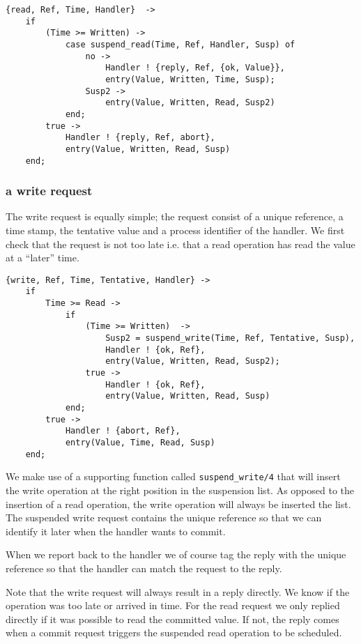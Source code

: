 \documentclass[a4paper, 11pt]{article}
\begin{document}
\begin{verbatim}
{read, Ref, Time, Handler}  ->
    if
        (Time >= Written) ->
            case suspend_read(Time, Ref, Handler, Susp) of
                no ->
                    Handler ! {reply, Ref, {ok, Value}},
                    entry(Value, Written, Time, Susp);
                Susp2 ->
                    entry(Value, Written, Read, Susp2)
            end;
        true ->
            Handler ! {reply, Ref, abort},
            entry(Value, Written, Read, Susp)
    end;
\end{verbatim}

\subsubsection{a write request}

The write request is equally simple; the request consist of a unique
reference, a time stamp, the tentative value and a process identifier
of the handler. We first check that the request is not too late
i.e. that a read operation has read the value at a ``later'' time. 

\begin{verbatim}        
{write, Ref, Time, Tentative, Handler} ->
    if 
        Time >= Read ->
            if 
                (Time >= Written)  ->
                    Susp2 = suspend_write(Time, Ref, Tentative, Susp),
                    Handler ! {ok, Ref},
                    entry(Value, Written, Read, Susp2);
                true ->
                    Handler ! {ok, Ref},
                    entry(Value, Written, Read, Susp)
            end;
        true ->
            Handler ! {abort, Ref},
            entry(Value, Time, Read, Susp)
    end;
\end{verbatim}

We make use of a supporting function called {\tt suspend\_write/4}
that will insert the write operation at the right position in the
suspension list. As opposed to the insertion of a read operation, the
write operation will always be inserted the list. The suspended
write request contains the unique reference so that we can identify it
later when the handler wants to commit.

When we report back to the handler we of course tag the reply with the
unique reference so that the handler can match the request to the
reply.

Note that the write request will always result in a reply directly. We
know if the operation was too late or arrived in time. For the read
request we only replied directly if it was possible to read the
committed value. If not, the reply comes when a commit request triggers
the suspended read operation to be scheduled.
\end{document}
